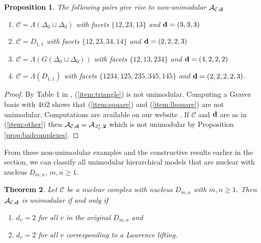 \documentclass[letterpaper,12pt]{amsart}
\theoremstyle{plain}
\newtheorem{thm}{Theorem}[section]
\newtheorem{prop}[thm]{Proposition}
\theoremstyle{definition}
\theoremstyle{remark}
\newcommand{\calc}{\mathcal{C}}
\begin{document}
\begin{prop}\label{badnonbinary}
	The following pairs give rise to non-unimodular $\mathcal{A}_{\mathcal{C},{\bf d}}$
	\begin{enumerate}
		\item\label{item:triangle} $\mathcal{C} = \Lambda(\Delta_0 \sqcup \Delta_0)$ with facets $\{12,23,13\}$ and ${\bf d} = (3,3,3)$
		\item\label{item:square} $\mathcal{C} = D_{1,1}$ with facets $\{12,23,34,14\}$ and ${\bf d} = (2,2,2,3)$
		\item\label{item:other} $\mathcal{C} = \Lambda(G(\Delta_0 \sqcup \Delta_0))$ with facets $\{12,13,234\}$ and ${\bf d} = (4,2,2,2)$
		\item\label{item:llsquare} $\mathcal{C} = \Lambda(D_{1,1})$ with facets $\{1234,125,235,345,145\}$ and ${\bf d} = (2,2,2,2,3)$.
	\end{enumerate}
\end{prop}
\begin{proof}
	By Table 1 in \cite{ohsugi-hibi2010}, (\ref{item:triangle}) is not unimodular.
	Computing a Graver basis with 4ti2 \cite{4ti2} shows that (\ref{item:square}) and (\ref{item:llsquare}) are not unimodular.  
	{Computations are available on our website \cite{BernsteinWeb2016}.}
	If $\mathcal{C}$ and ${\bf d}$ are as in (\ref{item:other}) then $\mathcal{A}_{\mathcal{C},{\bf d}} = \mathcal{A}_{J_1^*,{\bf 2}}$
	which is not unimodular by Proposition \ref{prop:badcomplexes}.
\end{proof}



From these non-unimodular examples and the constructive results earlier
in the section, we can classify all unimodular hierarchical models
that are nuclear with nucleus $D_{m,n}$, $m,n \geq 1$.

\begin{thm}\label{thm:dmnnonbinary}
Let $\calc$ be a nuclear complex with nucleus $D_{m,n}$ with
$m,n \geq 1$.  Then $\mathcal{A}_{\calc, {\bf d}}$ is unimodular
if and only if
\begin{enumerate}
\item  $d_{v} =2$ for all $v$ in the original $D_{m,n}$ and
\item  $d_{v} = 2$ for all $v$ corresponding to a Lawrence lifting.
\end{enumerate}
\end{thm}
\end{document}
